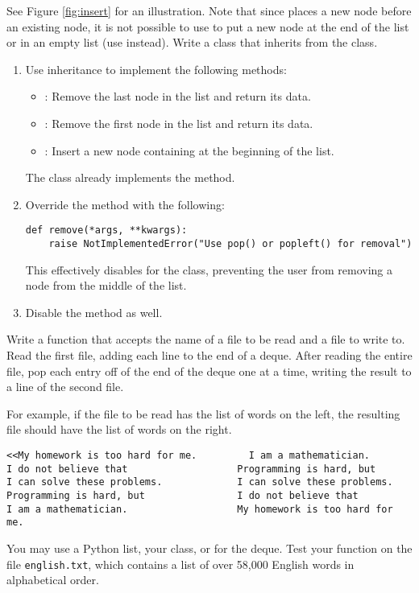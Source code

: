 See Figure \ref{fig:insert} for an illustration.
Note that since  places a new node before an existing node, it is not possible to use  to put a new node at the end of the list or in an empty list (use  instead).
Write a  class that inherits from the  class.
%
\begin{enumerate}
\item Use inheritance to implement the following methods:
%
\begin{itemize}
    \item {}: Remove the last node in the list and return its data.
    \item {}: Remove the first node in the list and return its data.
    \item {}: Insert a new node containing  at the beginning of the list.
\end{itemize}
The  class already implements the  method.

\item Override the  method with the following:

\begin{lstlisting}
def remove(*args, **kwargs):
    raise NotImplementedError("Use pop() or popleft() for removal")
\end{lstlisting}

This effectively disables  for the  class, preventing the user from removing a node from the middle of the list.

\item Disable the  method as well.
\end{enumerate}
Write a function that accepts the name of a file to be read and a file to write to.
Read the first file, adding each line to the end of a deque.
After reading the entire file, pop each entry off of the end of the deque one at a time, writing the result to a line of the second file.

For example, if the file to be read has the list of words on the left, the resulting file should have the list of words on the right.

\begin{lstlisting}
<<My homework is too hard for me.         I am a mathematician.
I do not believe that                   Programming is hard, but
I can solve these problems.             I can solve these problems.
Programming is hard, but                I do not believe that
I am a mathematician.                   My homework is too hard for me.
\end{lstlisting}

You may use a Python list, your  class, or  for the deque.
Test your function on the file \texttt{english.txt}, which contains a list of over 58,000 English words in alphabetical order.

